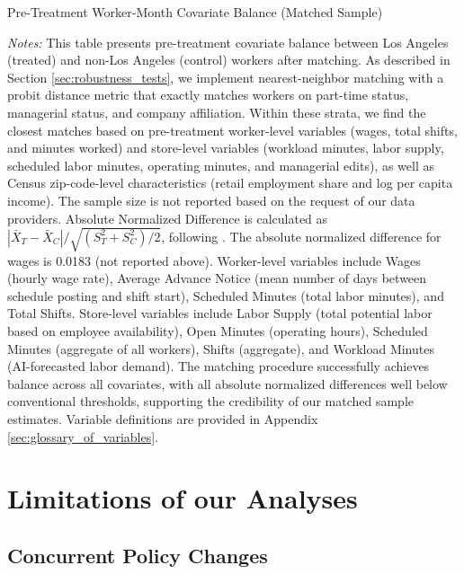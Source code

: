 \documentclass[letterpaper,11pt,leqno]{article}
\theoremstyle{paper}
\newcommand{\note}[2][]{\parbox{\textwidth}{\footnotesize\vspace*{10pt}\textit{#1}#2}}
\begin{document}
\begin{singlespace}
\begin{table}[H]
\caption{Pre-Treatment Worker-Month Covariate Balance (Matched Sample)}

\note{\scriptsize\textit{Notes: } This table presents pre-treatment covariate balance between Los Angeles (treated) and non-Los Angeles (control) workers after matching. As described in Section \ref{sec:robustness_tests}, we implement nearest-neighbor matching with a probit distance metric that exactly matches workers on part-time status, managerial status, and company affiliation. Within these strata, we find the closest matches based on pre-treatment worker-level variables (wages, total shifts, and minutes worked) and store-level variables (workload minutes, labor supply, scheduled labor minutes, operating minutes, and managerial edits), as well as Census zip-code-level characteristics (retail employment share and log per capita income). The sample size is not reported based on the request of our data providers. Absolute Normalized Difference is calculated as $|\bar{X}_T - \bar{X}_C|/\sqrt{(S^2_T + S^2_C)/2}$, following \cite{imbens2015causal}.  The absolute normalized difference for wages is 0.0183 (not reported above). Worker-level variables include Wages (hourly wage rate), Average Advance Notice (mean number of days between schedule posting and shift start), Scheduled Minutes (total labor minutes), and Total Shifts. Store-level variables include Labor Supply (total potential labor based on employee availability), Open Minutes (operating hours), Scheduled Minutes (aggregate of all workers), Shifts (aggregate), and Workload Minutes (AI-forecasted labor demand). The matching procedure successfully achieves balance across all covariates, with all absolute normalized differences well below conventional thresholds, supporting the credibility of our matched sample estimates. Variable definitions are provided in Appendix \ref{sec:glossary_of_variables}.}
\label{table:worker_summary_wide_matched}
\end{table}
\end{singlespace}




\pagebreak 
\section{Limitations of our Analyses} \label{sec:limitations}
\subsection{Concurrent Policy Changes}
\end{document}
